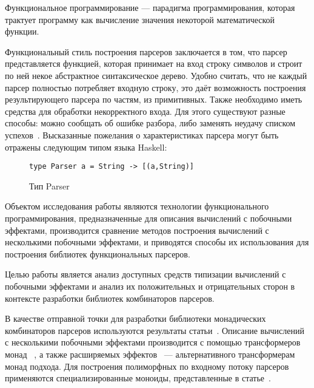 





\Intro
Функциональное программирование --- парадигма программирования, которая трактует
программу как вычисление значения некоторой математической функции.

Функциональный стиль построения парсеров заключается в том, что парсер
представляется функцией, которая принимает на вход строку символов и строит
по ней некое абстрактное синтаксическое дерево. Удобно считать, что не каждый
парсер полностью потребляет входную строку, это даёт возможность
построения результирующего парсера по частям, из примитивных. Также необходимо
иметь средства для обработки некорректного входа. Для этого существуют разные
способы: можно сообщать об ошибке разбора, либо заменять неудачу списком
успехов~\cite{wadlerSuccess}. Высказанные пожелания о характеристиках
парсера могут быть отражены следующим типом языка Haskell:

\begin{figure}[h]
\begin{lstlisting}
type Parser a = String -> [(a,String)]
\end{lstlisting}
\caption{Тип Parser}
\end{figure}

Объектом исследования работы являются технологии функционального программирования,
предназначенные для описания вычислений с побочными эффектами, производится
сравнение методов построения вычислений с несколькими побочными эффектами,
и приводятся способы их использования для построения библиотек функциональных
парсеров.

Целью работы является анализ доступных средств типизации вычислений с побочными
эффектами и анализ их положительных и отрицательных сторон в контексте
разработки библиотек комбинаторов парсеров.

В качестве отправной точки для разработки библиотеки монадических комбинаторов
парсеров используются результаты статьи~\cite{monParsing}. Описание вычислений
с несколькими побочными эффектами производится с помощью трансформеров монад
~\cite{monadTransformers}, а также расширяемых эффектов~\cite{extEffects} ---
альтернативного трансформерам монад подхода. Для построения полиморфных по
входному потоку парсеров применяются специализированные моноиды, представленные
в статье~\cite{monoids}.

